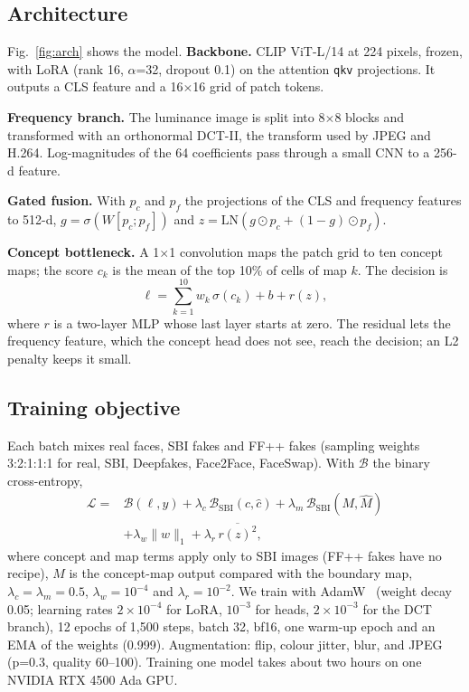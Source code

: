 \documentclass[conference]{IEEEtran}
\begin{document}
\subsection{Architecture}
Fig.~\ref{fig:arch} shows the model. \textbf{Backbone.} CLIP ViT-L/14 at 224 pixels, frozen, with LoRA (rank 16, $\alpha$=32, dropout 0.1) on the
attention \texttt{qkv} projections. It outputs a CLS feature and a 16$\times$16 grid of patch tokens.

\textbf{Frequency branch.} The luminance image is split into 8$\times$8 blocks and transformed with an orthonormal
DCT-II, the transform used by JPEG and H.264. Log-magnitudes of the 64 coefficients pass through a small CNN to a
256-d feature.

\textbf{Gated fusion.} With $p_c$ and $p_f$ the projections of the CLS and frequency features to 512-d,
$g=\sigma(W[p_c;p_f])$ and $z=\mathrm{LN}(g\odot p_c+(1-g)\odot p_f)$.

\textbf{Concept bottleneck.} A 1$\times$1 convolution maps the patch grid to ten concept maps; the score $c_k$ is
the mean of the top 10\% of cells of map $k$. The decision is
\begin{equation}
\ell = \sum_{k=1}^{10} w_k\,\sigma(c_k) + b + r(z),
\end{equation}
where $r$ is a two-layer MLP whose last layer starts at zero. The residual lets the frequency feature, which the
concept head does not see, reach the decision; an L2 penalty keeps it small.

\subsection{Training objective}
Each batch mixes real faces, SBI fakes and FF++ fakes (sampling weights 3:2:1:1:1 for real, SBI, Deepfakes,
Face2Face, FaceSwap). With $\mathcal{B}$ the binary cross-entropy,
\begin{align}
\mathcal{L} = {} & \mathcal{B}(\ell,y) + \lambda_c\,\mathcal{B}_{\mathrm{SBI}}(c,\hat c)
+ \lambda_m\,\mathcal{B}_{\mathrm{SBI}}(M,\hat M) \nonumber\\
& + \lambda_w\|w\|_1 + \lambda_r\,\overline{r(z)^2},
\end{align}
where concept and map terms apply only to SBI images (FF++ fakes have no recipe), $M$ is the concept-map output
compared with the boundary map, $\lambda_c=\lambda_m=0.5$, $\lambda_w=10^{-4}$ and $\lambda_r=10^{-2}$.
We train with AdamW~\cite{adamw} (weight decay 0.05; learning rates $2\times10^{-4}$ for LoRA, $10^{-3}$ for heads,
$2\times10^{-3}$ for the DCT branch), 12 epochs of 1,500 steps, batch 32, bf16, one warm-up epoch and an EMA of the
weights (0.999). Augmentation: flip, colour jitter, blur, and JPEG (p=0.3, quality 60--100). Training one model
takes about two hours on one NVIDIA RTX 4500 Ada GPU.
\end{document}
